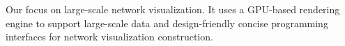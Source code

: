 Our \name focus on large-scale network visualization. It uses a GPU-based rendering engine to support large-scale data and design-friendly concise programming interfaces for network visualization construction.









